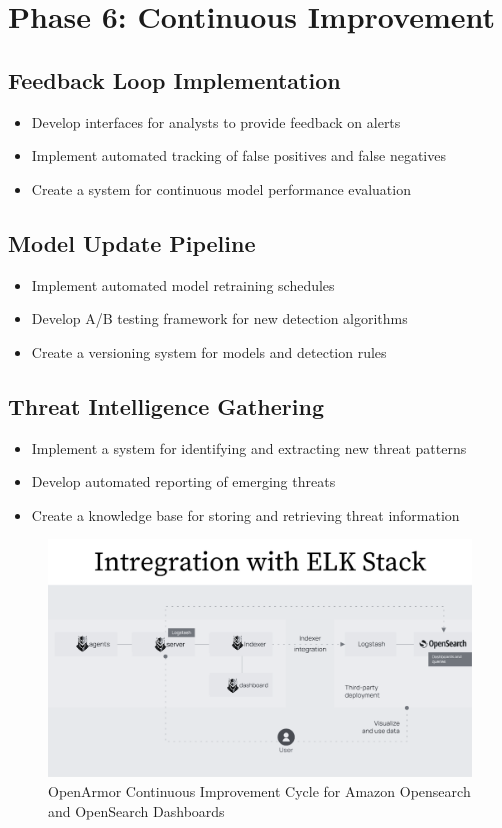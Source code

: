 \section{Phase 6: Continuous Improvement}

\subsection{Feedback Loop Implementation}
\begin{itemize}
    \item Develop interfaces for analysts to provide feedback on alerts
    \item Implement automated tracking of false positives and false negatives
    \item Create a system for continuous model performance evaluation
\end{itemize}

\subsection{Model Update Pipeline}
\begin{itemize}
    \item Implement automated model retraining schedules
    \item Develop A/B testing framework for new detection algorithms
    \item Create a versioning system for models and detection rules
\end{itemize}

\subsection{Threat Intelligence Gathering}
\begin{itemize}
    \item Implement a system for identifying and extracting new threat patterns
    \item Develop automated reporting of emerging threats
    \item Create a knowledge base for storing and retrieving threat information
\end{itemize}

\begin{figure}[h]
    \centering
    \includegraphics[width=1\linewidth]{integration-diagram-opensearch.png}
    \caption{OpenArmor Continuous Improvement Cycle for Amazon Opensearch and OpenSearch Dashboards}
    \label{fig:continuous-improvement-cycle}
\end{figure}

